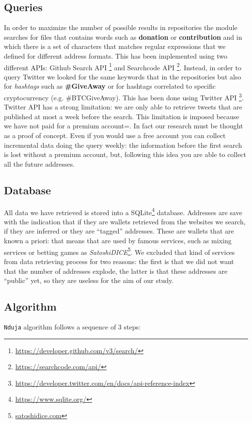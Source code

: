 \subsection{Queries} 
\label{sec:queries}
In order to maximize the number of possible results in repositories the module
\walletcollector{} searches for files that contains words such as
\textbf{donation} or \textbf{contribution} and in which there is a set of
characters that matches regular expressions that we defined for different
address formats. This has been implemented using two different APIs: Github
Search API \footnote{\url{https://developer.github.com/v3/search/}} and
Searchcode API \footnote{\url{https://searchcode.com/api/}}.
Instead, in order to query Twitter we looked for the same keywords that in the
repositories but also for \textit{hashtags} such as \textbf{\#GiveAway} or for
hashtags correlated to specific cryptocurrency (e.g. \#BTCGiveAway). This has
been done using Twitter API
\footnote{\url{https://developer.twitter.com/en/docs/api-reference-index}}.
Twitter API has a strong limitation: we are only able to retrieve tweets that
are published at most a week before the search. This limitation is imposed
because we have not paid for a premium account=. In fact our research must be
thought as a proof of concept. Even if you would use a free account you can
collect incremental data doing the query weekly: the information before the
first search is lost without a premium account, but, following this idea you
are able to collect all the future addresses.

\subsection{Database}
All data we have retrieved is stored into a
SQLite\footnote{\url{https://www.sqlite.org/}} database. Addresses are save with
the indication that if they are wallets retrieved from the websites we search,
if they are inferred or they are ``tagged'' addresses. These are wallets that
are known a priori: that means that are used by famous services, such as mixing
services or betting games as
\textit{SatoshiDICE}\footnote{\url{satoshidice.com}}. We excluded that kind of
services from data retrieving process for two reasons: the first is that we did
not want that the number of addresses explode, the latter is that these
addresses are ``public'' yet, so they are useless for the aim of our study.

\subsection{Algorithm}
\texttt{Nduja} algorithm follows a sequence of 3 steps:
